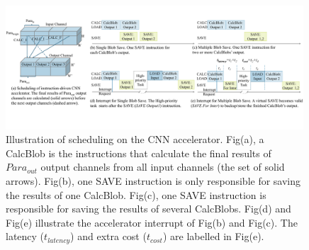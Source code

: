 







\begin{figure}[t]
    \centering
	\includegraphics[width=0.99\textwidth]{fig/singlesave.pdf} 	
	\vspace{-1mm} 
    \caption{
		Illustration of scheduling on the CNN accelerator. Fig(a), a CalcBlob is the instructions that calculate the final results of $Para_{out}$ output channels from all input channels (the set of solid arrows). Fig(b), one SAVE instruction is only responsible for saving the results of one CalcBlob. Fig(c), one SAVE instruction is responsible for saving the results of several CalcBlobs. Fig(d) and Fig(e) illustrate the accelerator interrupt of Fig(b) and Fig(c). The latency ($t_{latency}$) and extra cost ($t_{cost}$) are labelled in Fig(e).
    }
	\label{fig:singlesave}
\end{figure}



